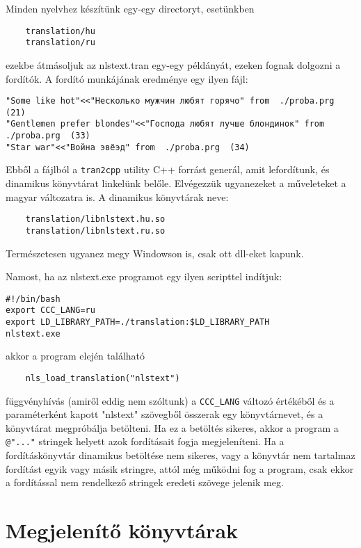Minden nyelvhez készítünk egy-egy directoryt, esetünkben 
\begin{verbatim}
    translation/hu
    translation/ru
\end{verbatim}
ezekbe átmásoljuk az nlstext.tran egy-egy példányát, 
ezeken fognak dolgozni a fordítók. A fordító munkájának
eredménye egy ilyen fájl:
\begin{verbatim}
"Some like hot"<<"Несколько мужчин любят горячо" from  ./proba.prg  (21)
"Gentlemen prefer blondes"<<"Господа любят лучше блондинок" from  ./proba.prg  (33)
"Star war"<<"Война эвёэд" from  ./proba.prg  (34)
\end{verbatim}
Ebből a fájlból a \verb!tran2cpp! utility  C++ forrást generál,
amit lefordítunk, és  dinamikus könyvtárat linkelünk belőle.
Elvégezzük ugyanezeket a műveleteket a magyar változatra is.
A dinamikus könyvtárak neve:
\begin{verbatim}
    translation/libnlstext.hu.so
    translation/libnlstext.ru.so
\end{verbatim}
Természetesen ugyanez megy Windowson is, csak ott dll-eket kapunk.

Namost, ha az nlstext.exe programot egy ilyen scripttel indítjuk:
\begin{verbatim}
#!/bin/bash
export CCC_LANG=ru
export LD_LIBRARY_PATH=./translation:$LD_LIBRARY_PATH
nlstext.exe
\end{verbatim}
akkor a program elején található
\begin{verbatim}
    nls_load_translation("nlstext")
\end{verbatim}
függvényhívás (amiről eddig nem szóltunk) a \verb!CCC_LANG!
változó értékéből és a paraméterként kapott "nlstext" szövegből
összerak egy könyvtárnevet, és a könyvtárat megpróbálja betölteni. 
Ha ez a betöltés sikeres, akkor a program a \verb!@"..."! stringek
helyett azok fordításait fogja megjeleníteni. Ha a fordításkönyvtár
dinamikus betöltése nem sikeres, vagy a könyvtár nem tartalmaz fordítást
egyik vagy másik stringre, attól még  működni fog a program,
csak ekkor a fordítással nem rendelkező stringek eredeti szövege 
jelenik meg.

\section{Megjelenítő könyvtárak}

